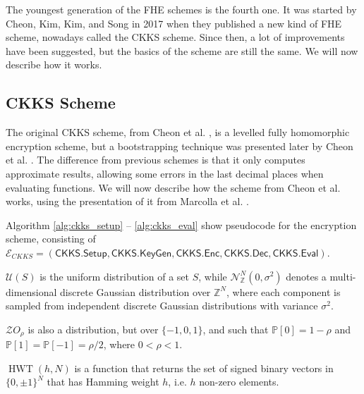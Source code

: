 The youngest generation of the FHE schemes is the fourth one. It was started by Cheon, Kim, Kim, and Song in 2017 \cite{cite:ckks} when they published a new kind of FHE scheme, nowadays called the CKKS scheme. Since then, a lot of improvements have been suggested, but the basics of the scheme are still the same. We will now describe how it works. 

\subsection{CKKS Scheme}\label{sec:ckks}

The original CKKS scheme, from Cheon et al. \cite{cite:ckks}, is a levelled fully homomorphic encryption scheme, but a bootstrapping technique was presented later by Cheon et al. \cite{cite:ckks_bootstrap}. The difference from previous schemes is that it only computes approximate results, allowing some errors in the last decimal places when evaluating functions. We will now describe how the scheme from Cheon et al. \cite{cite:ckks} works, using the presentation of it from Marcolla et al. \cite{cite:QianFHE}.


Algorithm \ref{alg:ckks_setup} -- \ref{alg:ckks_eval} show pseudocode for the encryption scheme, consisting of $\mathcal{E}_{CKKS} = (\mathsf{CKKS.Setup, CKKS.KeyGen, CKKS.Enc, CKKS.Dec, CKKS.Eval})$.

$\mathcal{U}(S)$ is the uniform distribution of a set $S$, while $\mathcal{N}_{\mathbb{Z}}^N(0,\sigma^2)$ denotes a multi-dimensional discrete Gaussian distribution over $\mathbb{Z}^N$, where each component is sampled from independent discrete Gaussian distributions with variance $\sigma^2$.

$\mathcal{Z}O_{\rho}$ is also a distribution, but over $\{ -1, 0, 1 \}$, and such that $\mathbb{P}[0] = 1-\rho$ and $\mathbb{P}[1] = \mathbb{P}[-1] = \rho/2$, where $0 < \rho < 1$.

$\operatorname{HWT}(h, N)$ is a function that returns the set of signed binary vectors in $\{0, \pm 1 \}^N$ that has Hamming weight $h$, i.e. $h$ non-zero elements.


